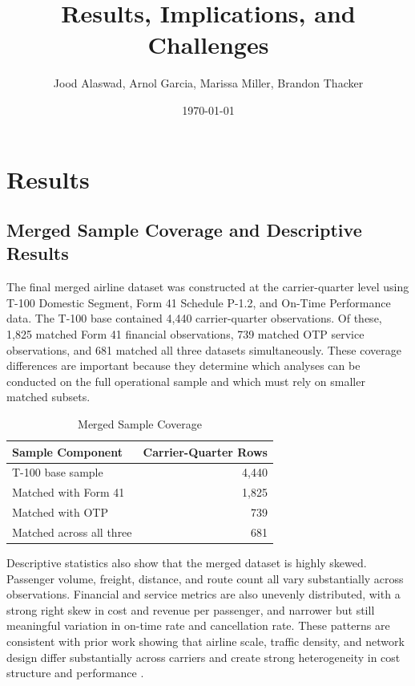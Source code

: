 \documentclass[11pt, letterpaper]{article}
\begin{document}
\title{Results, Implications, and Challenges}
\author{Jood Alaswad, Arnol Garcia, Marissa Miller, Brandon Thacker}
\date{\today}
\maketitle

\tableofcontents
\newpage
\setcounter{page}{1}

\section{Results}

\subsection{Merged Sample Coverage and Descriptive Results}
The final merged airline dataset was constructed at the carrier-quarter level using T-100 Domestic Segment, Form 41 Schedule P-1.2, and On-Time Performance data. The T-100 base contained 4,440 carrier-quarter observations. Of these, 1,825 matched Form 41 financial observations, 739 matched OTP service observations, and 681 matched all three datasets simultaneously. These coverage differences are important because they determine which analyses can be conducted on the full operational sample and which must rely on smaller matched subsets.

\begin{table}[H]
\centering
\caption{Merged Sample Coverage}
\label{tab:coverage}
\begin{tabular}{lr}
\toprule
Sample Component & Carrier-Quarter Rows \\
\midrule
T-100 base sample & 4,440 \\
Matched with Form 41 & 1,825 \\
Matched with OTP & 739 \\
Matched across all three & 681 \\
\bottomrule
\end{tabular}
\end{table}

Descriptive statistics also show that the merged dataset is highly skewed. Passenger volume, freight, distance, and route count all vary substantially across observations. Financial and service metrics are also unevenly distributed, with a strong right skew in cost and revenue per passenger, and narrower but still meaningful variation in on-time rate and cancellation rate. These patterns are consistent with prior work showing that airline scale, traffic density, and network design differ substantially across carriers and create strong heterogeneity in cost structure and performance \cite{banker1993,caves1984,zuidberg2014}.
\end{document}
